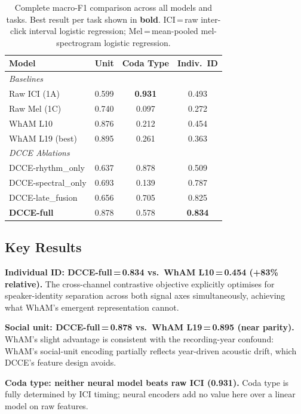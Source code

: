 \documentclass[9pt,a4paper,twocolumn,twoside]{rho-class/rho}
\begin{document}
\begin{table}[H]
\centering
\caption{Complete macro-F1 comparison across all models and tasks. Best result per task shown in \textbf{bold}. ICI\,=\,raw inter-click interval logistic regression; Mel\,=\,mean-pooled mel-spectrogram logistic regression.}
\label{tab:results}
\small
\setlength{\tabcolsep}{4pt}
\begin{tabular}{lccc}
\toprule
\textbf{Model} & \textbf{Unit} & \textbf{Coda Type} & \textbf{Indiv.\ ID}\\
\midrule
\multicolumn{4}{l}{\textit{Baselines}}\\
Raw ICI (1A)         & 0.599 & \textbf{0.931} & 0.493 \\
Raw Mel (1C)         & 0.740 & 0.097 & 0.272 \\
WhAM L10             & 0.876 & 0.212 & 0.454 \\
WhAM L19 (best)      & 0.895 & 0.261 & 0.363 \\
\midrule
\multicolumn{4}{l}{\textit{DCCE Ablations}}\\
DCCE-rhythm\_only    & 0.637 & 0.878 & 0.509 \\
DCCE-spectral\_only  & 0.693 & 0.139 & 0.787 \\
DCCE-late\_fusion    & 0.656 & 0.705 & 0.825 \\
\textbf{DCCE-full}   & 0.878 & 0.578 & \textbf{0.834}\\
\bottomrule
\end{tabular}
\end{table}

\subsection{Key Results}

\textbf{Individual ID: DCCE-full\,=\,0.834 vs.\ WhAM L10\,=\,0.454 (+83\% relative).} The cross-channel contrastive objective explicitly optimises for speaker-identity separation across both signal axes simultaneously, achieving what WhAM's emergent representation cannot.

\textbf{Social unit: DCCE-full\,=\,0.878 vs.\ WhAM L19\,=\,0.895 (near parity).} WhAM's slight advantage is consistent with the recording-year confound: WhAM's social-unit encoding partially reflects year-driven acoustic drift, which DCCE's feature design avoids.

\textbf{Coda type: neither neural model beats raw ICI (0.931).} Coda type is fully determined by ICI timing; neural encoders add no value here over a linear model on raw features.
\end{document}
